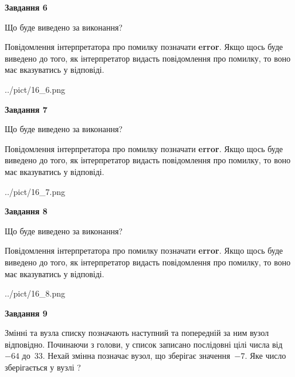 \documentclass[12pt, ukrainian]{article}
\begin{document}
{\begin {large}
{\begin {center}\textbf{Завдання 6}\end {center}}\par
Що буде виведено за виконання?

Повідомлення інтерпретатора про помилку позначати \textbf{error}.
Якщо щось буде виведено до того, як інтерпретатор видасть повідомлення про помилку, 
то воно має вказуватись у відповіді. \par


\begin{center}
	{../pict/16_6.png}
\end{center}
\newpage

{\begin {center}\textbf{Завдання 7}\end {center}}\par
Що буде виведено за виконання?

Повідомлення інтерпретатора про помилку позначати \textbf{error}.
Якщо щось буде виведено до того, як інтерпретатор видасть повідомлення про помилку, 
то воно має вказуватись у відповіді. \par


\begin{center}
	{../pict/16_7.png}
\end{center}
\newpage

{\begin {center}\textbf{Завдання 8}\end {center}}\par
Що буде виведено за виконання?

Повідомлення інтерпретатора про помилку позначати \textbf{error}.
Якщо щось буде виведено до того, як інтерпретатор видасть повідомлення про помилку, 
то воно має вказуватись у відповіді. \par


\begin{center}
	{../pict/16_8.png}
\end{center}
\newpage

{\begin {center}\textbf{Завдання 9}\end {center}}\par
Змінні  та  вузла списку позначають наступний та попередній за ним вузол відповідно. Починаючи з голови, у список записано послідовні цілі числа від~$-64$ до~$33$. Нехай змінна  позначає вузол, що зберігає значення~$-7$.
Яке число зберігається у вузлі  ?\par
\newpage


\end{large}}
\end{document}
